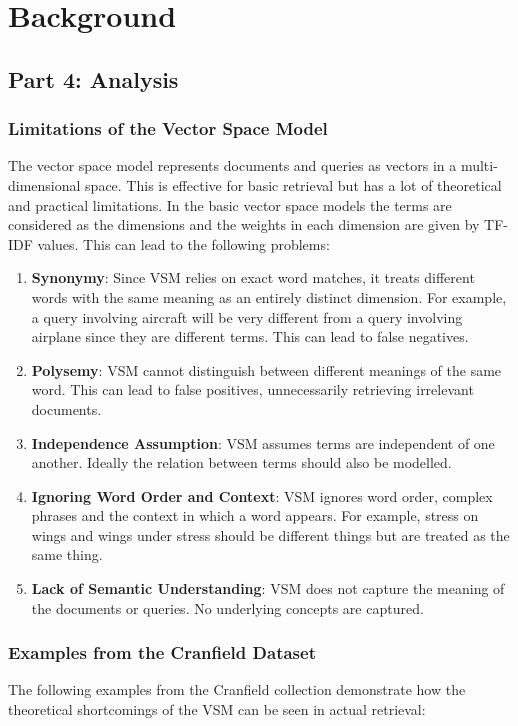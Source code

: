\section{Background}\label{sec:background}

\subsection{Part 4: Analysis}
\subsubsection{Limitations of the Vector Space Model}
The vector space model represents documents and queries as vectors in a multi-dimensional space. This is effective for basic retrieval but has a lot of theoretical and practical limitations. In the basic vector space models the terms are considered as the dimensions and the weights in each dimension are given by TF-IDF values. This can lead to the following problems:
\begin{enumerate}
    \item \textbf{Synonymy}: Since VSM relies on exact word matches, it treats different words with the same meaning as an entirely distinct dimension. For example, a query involving aircraft will be very different from a query involving airplane since they are different terms. This can lead to false negatives.
    \item \textbf{Polysemy}: VSM cannot distinguish between different meanings of the same word. This can lead to false positives, unnecessarily retrieving irrelevant documents.
    \item \textbf{Independence Assumption}: VSM assumes terms are independent of one another. Ideally the relation between terms should also be modelled.
    \item \textbf{Ignoring Word Order and Context}: VSM ignores word order, complex phrases and the context in which a word appears. For example, stress on wings and wings under stress should be different things but are treated as the same thing.
    \item \textbf{Lack of Semantic Understanding}: VSM does not capture the meaning of the documents or queries. No underlying concepts are captured.
\end{enumerate}

\subsubsection{Examples from the Cranfield Dataset}
The following examples from the Cranfield collection demonstrate how the theoretical shortcomings of the VSM can be seen in actual retrieval:

